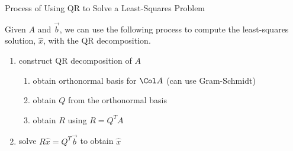 \begin{frame}{Process of Using QR to Solve a Least-Squares Problem}

    Given $A$ and $\vec b$, we can use the following process to compute the least-squares solution, $\widehat x$, with the QR decomposition. 
    \vspace{8pt}
    \begin{enumerate}\setlength{\itemsep}{8pt}
        \item<2-> construct QR decomposition of $A$
        \vspace{6pt}
        
        \begin{enumerate}\setlength{\itemsep}{6pt}
            \item<3->[a)] {\normalsize obtain orthonormal basis for $\Col A$ (can use Gram-Schmidt)}
            \item<4->[b)] {\normalsize obtain $Q$ from the orthonormal basis}
            \item<5->[c)] {\normalsize obtain $R$ using $R = Q^TA$}
        \end{enumerate}
        \item<6-> solve $R\widehat x = Q^T\vec b$ to obtain $\widehat x$
    \end{enumerate}
    
\end{frame}
    


